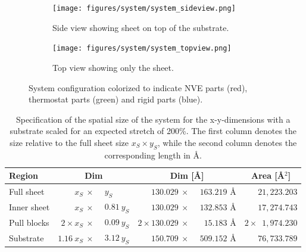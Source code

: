 \begin{figure}[H]
  \centering
  \begin{subfigure}[b]{0.80\textwidth}
      \centering
      \texttt{[image: figures/system/system\_sideview.png]}
      \caption{Side view showing sheet on top of the substrate.}
      \label{fig:sideview}
  \end{subfigure}
  \hfill
  \begin{subfigure}[b]{0.80\textwidth}
      \centering
      \texttt{[image: figures/system/system\_topview.png]}
      \caption{Top view showing only the sheet.}
      \label{fig:topview}
  \end{subfigure}
  \hfill
     \caption{System configuration colorized to indicate NVE parts (red), thermostat parts (green) and rigid parts (blue).}
     \label{fig:system}
\end{figure}



\begin{table}[H]
  \begin{center}
  \caption{Specification of the spatial size of the system for the x-y-dimensions with a substrate scaled for an expected stretch of 200\%. The first column denotes the size relative to the full sheet size $x_S \times y_S$, while the second column denotes the corresponding length in Å.}
  \label{tab:sheet_dim}
  \begin{tabular}{ | l | r@{}l | r@{}l | c |} \hline
    \textbf{Region} & \multicolumn{2}{c|}{Dim} & \multicolumn{2}{c|}{Dim
    [Å]} & Area [Å$^2$]\\ \hline
  Full sheet & $x_S \: \times \: $ & $y_S$ &  $130.029 \: \times \:$ & $163.219$ Å & $\phantom{2\times} 21,223.203$ \\ \hline
  Inner sheet & $x_S \: \times \:$ & $0.81 \ y_S$ &  $130.029  \: \times \:$ & $132.853$ Å & $\phantom{2\times} 17,274.743$\\ \hline
  Pull blocks & $2 \times x_S \: \times \:$ & $ 0.09 \ y_S$ & $2 \times 130.029  \: \times \: $ & $\phantom{0}15.183$ Å  & $2 \times \phantom{0}1,974.230$ \\ \hline  
  Substrate & $1.16 \ x_S \: \times \:$ & $3.12 \ y_S$ &  $150.709  \: \times \:$ & $509.152$ Å & $\phantom{2\times} 76,733.789$\\ \hline
\end{tabular}
\end{center}
\end{table}



